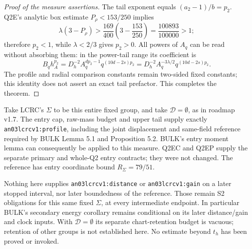 \documentclass[11pt]{article}
\theoremstyle{remark}\newtheorem{remark}[theorem]{Remark}
\begin{document}
\begin{proof}[Proof of the measure assertions]
The tail exponent equals $(a_2-1)/b=p_2$.
Q2E's analytic box estimate $P_\rho<153/250$ implies
\[
 \lambda(3-P_\rho)>
 \frac{169}{400}\left(3-\frac{153}{250}\right)
 =\frac{100893}{100000}>1;
\]
therefore $p_2<1$, while $\lambda<2/3$ gives $p_2>0$.
All powers of $A_q$ can be read without absorbing them:
in the power-tail range its coefficient is
\begin{equation}
 B_q h_A^{p_2}
 =D_h^{-2}A_q^{dp_2-1}q^{(10d-2s)p_2}
 =D_h^{-2}A_q^{-3\lambda/2}q^{(10d-2s)p_2}.
 \label{an02sepv1:Apower}
\end{equation}
The profile and radial comparison constants remain two-sided
fixed constants; this identity does not assert an exact tail
prefactor. This completes the theorem.
\end{proof}

Take LCRC's $\Sigma$ to be this entire fixed group, and take
$\mathcal D=\emptyset$, as in roadmap v1.7. The entry cap,
raw-mass budget and upper tail supply exactly
\texttt{an03lcrcv1:profile}, including the joint displacement
and same-field reference required by BULK Lemma 5.1 and
Proposition 5.2. BULK's entry moment lemma can consequently
be applied to this measure. Q2EC and Q2EP supply the separate
primary and whole-Q2 entry contracts; they were not changed.
The reference has entry coordinate bound $R_\Sigma=79/51$.

Nothing here supplies \texttt{an03lcrcv1:distance} or
\texttt{an03lcrcv1:gain} on a later stopped interval, nor
later boundedness of the reference. Those remain S2 obligations
for this same fixed $\Sigma$, at every intermediate endpoint.
In particular BULK's secondary energy corollary remains
conditional on its later distance/gain and clock inputs.
With $\mathcal D=\emptyset$ its separate chart-retention budget
is vacuous; retention of other groups is not established here.
No estimate beyond $t_h$ has been proved or invoked.
\end{document}
